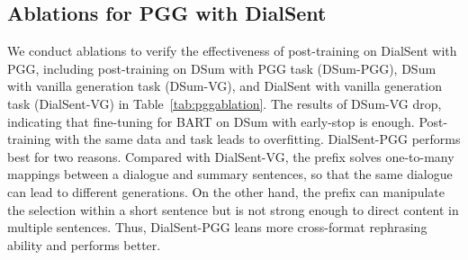 \subsection{Ablations for PGG with DialSent}\label{sec:pggablation}

We conduct ablations to verify the effectiveness of post-training on DialSent with PGG, including post-training on DSum with PGG task (DSum-PGG), DSum with vanilla generation task (DSum-VG), and DialSent with vanilla generation task (DialSent-VG) in Table~\ref{tab:pggablation}.
The results of DSum-VG drop, indicating that fine-tuning for BART on DSum with early-stop is enough. Post-training with the same data and task leads to overfitting. 
DialSent-PGG performs best for two reasons. Compared with DialSent-VG, the prefix solves one-to-many mappings between a dialogue and summary sentences, so that the same dialogue can lead to different generations.
On the other hand, 
the prefix can manipulate the selection within a short sentence but is not strong enough to direct content in multiple sentences. Thus, DialSent-PGG leans more cross-format rephrasing ability and performs better.



